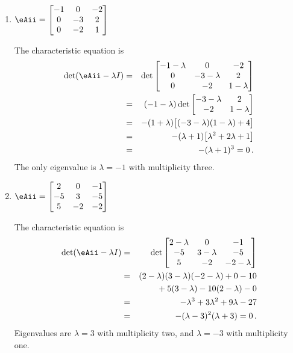 \begin{example}
\begin{enumerate}
\item\label{eg:faem:c} \(\eAii=\begin{bmatrix}-1&0&-2
\\0&-3&2
\\0&-2&1\end{bmatrix}\)
\begin{solution}The characteristic equation is 
\begin{eqnarray*}
\det(\eAii-\lambda I)
&=&\det\begin{bmatrix}-1-\lambda&0&-2
\\0&-3-\lambda&2
\\0&-2&1-\lambda\end{bmatrix}
\\&=&(-1-\lambda)\det\begin{bmatrix} -3-\lambda&2
\\-2&1-\lambda \end{bmatrix}
\\&=&-(1+\lambda)\big[(-3-\lambda)(1-\lambda)+4\big]
\\&=&-(\lambda+1)\big[\lambda^2+2\lambda+1\big]
\\&=&-(\lambda+1)^3=0\,.
\end{eqnarray*}
The only eigenvalue is \(\lambda=-1\) with multiplicity three.
\end{solution}

\item \(\eAii=\begin{bmatrix}2&0&-1
\\-5&3&-5
\\5&-2&-2\end{bmatrix}\)
\begin{solution}The characteristic equation is 
\begin{eqnarray*}
\det(\eAii-\lambda I)
&=&\det\begin{bmatrix}2-\lambda&0&-1
\\-5&3-\lambda&-5
\\5&-2&-2-\lambda\end{bmatrix}
\\&=&(2-\lambda)(3-\lambda)(-2-\lambda)+0-10
\\&&{}
+5(3-\lambda)-10(2-\lambda)-0
\\&=&-\lambda^3+3\lambda^2+9\lambda-27
\\&=&-(\lambda-3)^2(\lambda+3)=0\,.
\end{eqnarray*}
Eigenvalues are \(\lambda=3\) with multiplicity two, and \(\lambda=-3\) with multiplicity one.
\end{solution}


\end{enumerate}
\end{example}
